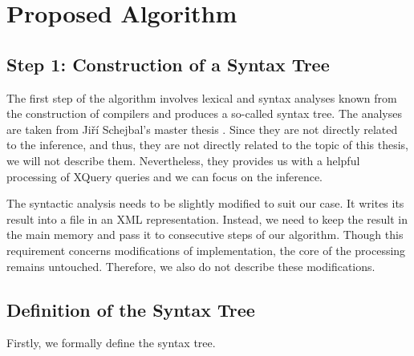 \chapter{Proposed Algorithm}

\section{Step 1: Construction of a Syntax Tree}
The first step of the algorithm involves lexical and syntax analyses known from the construction of compilers and produces a so-called syntax tree. The analyses are taken from Ji\v r\'{i} Schejbal's master thesis \cite{thesis_schejbal}. Since they are not directly related to the inference, and thus, they are not directly related to the topic of this thesis, we will not describe them. Nevertheless, they provides us with a helpful processing of XQuery queries and we can focus on the inference.

The syntactic analysis needs to be slightly modified to suit our case. It writes its result into a file in an XML representation. Instead, we need to keep the result in the main memory and pass it to consecutive steps of our algorithm. Though this requirement concerns modifications of implementation, the core of the processing remains untouched. Therefore, we also do not describe these modifications.

\section{Definition of the Syntax Tree}
Firstly, we formally define the syntax tree.

